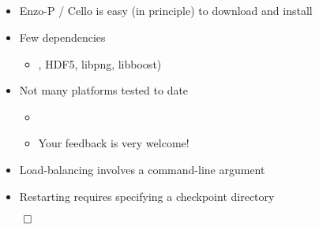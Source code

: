 \NEWSEC

\subsection{\ssStartingSummary}


\begin{frame}[fragile,label=ss-starting-summary] 
\secframetitle{\ssStartingSummary}
\begin{itemize}
\item Enzo-P / Cello is easy (in principle) to download and install
\item Few dependencies
\begin{itemize}
\item \charm, HDF5, libpng, libboost)
\end{itemize}
\item Not many platforms tested to date
\begin{itemize}
\item {}
\item Your feedback is very welcome!
\end{itemize}
\item Load-balancing involves a command-line argument
\item Restarting requires specifying a checkpoint directory
\end{itemize}
\vfill
\centerline{$\qed$}
\end{frame}

